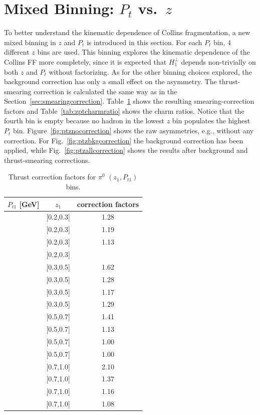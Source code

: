 \section{\texorpdfstring{Mixed Binning: $P_t$ vs.~$z$}{New kinematic Bins: pt Vs z bin}}
\label{sec:newbins}
To better understand the kinematic dependence of Collins fragmentation, a new mixed binning in $z$ and $P_t$ is introduced in this section. For each $P_t$ bin, 4 different $z$ bins are used. This binning explores the kinematic dependence of the Collins FF more completely, since it is expected that $H_1^{\bot}$ depends non-trivially on both $z$ and $P_t$ without factorizing. 
As  for the other binning choices explored, the background correction has only a small effect on the asymmetry. 
The thrust-smearing correction is calculated the same way as in the Section~\ref{sec:smearingcorrection}. 
Table~\ref{tab:16binsthrustfactor_compare} shows the resulting smearing-correction factors and Table~\ref{tab:zptcharmratio} shows the charm ratios. 
Notice that the fourth bin is empty because no hadron in the lowest $z$ bin populates the highest $P_t$ bin. 
Figure~\ref{fig:ptznocorrection} shows the raw asymmetries, e.g., without any correction. For Fig.~\ref{fig:ptzbkgcorrection} the background correction has been applied, while Fig.~\ref{fig:ptzallcorrection} shows the results after background and thrust-smearing corrections. 

\begin{table}[H]\tiny
\centering
\begin{tabular}{|c|c|c|}
\hline
$P_{t1}$ [GeV]  & $z_{1}$  & correction factors   \\ \hline\hline
[0,0.15] & [0.2,0.3]	&		1.28	\\ \hline
[0.15,0.3] & [0.2,0.3] 	&		1.19	\\ \hline
[0.3,0.5]  & [0.2,0.3] 	&		1.13	\\ \hline
[0.5,3] & [0.2,0.3]  	&				\\ \hline\hline
[0,0.15] & [0.3,0.5]	&		1.62	\\ \hline
[0.15,0.3] & [0.3,0.5] 	&		1.28	\\ \hline
[0.3,0.5] & [0.3,0.5] 	&		1.17	\\ \hline
[0.5,3.0] & [0.3,0.5] 	&		1.29	\\ \hline\hline
[0,0.15] & [0.5,0.7] 	&		1.41	\\ \hline
[0.15,0.3] & [0.5,0.7] 	&		1.13	\\ \hline
[0.3,0.5] & [0.5,0.7]  	&		1.00	\\ \hline
[0.5,3.0] & [0.5,0.7]  	&		1.00	\\ \hline\hline
[0,0.15] & [0.7,1.0]	&		2.10	\\ \hline
[0.15,0.5]   & [0.7,1.0] 	&		1.37	\\ \hline
[0.3,0.5]  & [0.7,1.0] 	&		1.16	\\ \hline
[0.5,3.0] & [0.7,1.0]	&		1.08	\\ \hline
\end{tabular}
\caption{Thrust correction factors for $\pi^0$ $(z_1,P_{t1})$ bins.}
\label{tab:16binsthrustfactor_compare}
\end{table}


